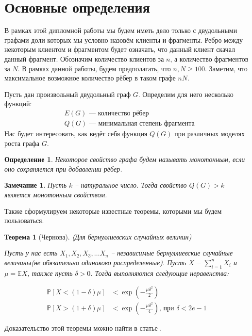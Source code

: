 \documentclass[10pt]{article}
\newcommand{\Expect}{\mathbb E}
\newcommand{\PRob}{\mathbb P}
\newcommand{\geqs}{\geqslant}
\newtheorem{note}{Замечание}
\newtheorem{define}{Определение}
\theoremstyle{named}
\newtheorem*{namedtheorem}{Теорема}
\begin{document}
\section{Основные определения}
В рамках этой дипломной работы мы будем иметь дело только с двудольными графами доли которых мы условно назовём клиенты и фрагменты.
Ребро между некоторым клиентом и фрагментом будет означать, что данный клиент скачал данный фрагмент.
Обозначим количество клиентов за $n$, а количество фрагментов за $N$. В рамках данной работы, будем предполагать, что $n, N \geqs 100$.
Заметим, что максимальное возможное количество рёбер в таком графе $nN$.

Пусть дан произвольный двудольный граф $G$. Определим для него несколько функций:
\begin{align*}
&E(G) \text{ --- количество рёбер}\\
&Q(G) \text{ --- минимальная степень фрагмента}
\end{align*}
Нас будет интересовать, как ведёт себя функция $Q(G)$ при различных моделях роста графа $G$.

\begin{define}
Некоторое свойство графа будем называть монотонным, если оно сохраняется при добавлении рёбер.
\end{define}

\begin{note}
Пусть $k$ -- натуральное число. Тогда свойство $Q(G) > k$ является монотонным свойством.
\end{note}

Также сформулируем некоторые известные теоремы, которыми мы будем пользоваться.
\begin{namedtheorem}[Чернова] (Для бернуллиевских случайных величин) \label{Cher} 

Пусть у нас есть $X_1, X_2, X_3, \dots X_n$ -- 
независимые бернуллиевские случайные величины(не обязательно одинаково распределенные). Пусть $X = \sum\limits_{i = 1}^n X_i$ и
$\mu = \Expect X$, также пусть $\delta > 0$. Тогда выполняются следующие неравенства:

\begin{align}
\PRob[X < (1-\delta)\mu] &< \exp\left(- \frac{\mu \delta^2}{2} \right)
\\
\PRob[X > (1+\delta)\mu] &< \exp\left(- \frac{\mu \delta^2}{4} \right) \text{, при } \delta < 2e - 1
\end{align}
\end{namedtheorem}
Доказательство этой теоремы можно найти в статье \cite{chernov}.
\end{document}
